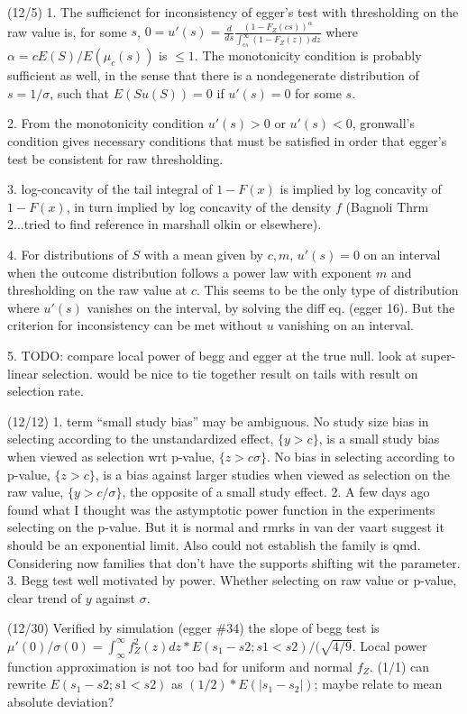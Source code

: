 \documentclass{article}
\begin{document}
(12/5) 1. The sufficienct for inconsistency of egger's test with
thresholding on the raw value is, for some $s$,
$0=u'(s)=\frac{d}{ds}\frac{(1-F_Z(cs))^\alpha}{\int_{cs}^{\infty}(1-F_Z(z))dz}$
where $\alpha=cE(S)/E(\mu_c(s))$ is $\le 1$. The monotonicity condition is probably
sufficient as well, in the sense that there is a nondegenerate distribution
of $s=1/\sigma$, such that $E(Su(S))=0$ if $u'(s)=0$ for some $s$.

2. From the monotonicity condition $u'(s)>0$ or $u'(s)<0$, gronwall's
condition gives necessary conditions that must be satisfied in order
that egger's test be consistent for raw thresholding.

3. log-concavity of the tail integral of $1-F(x)$ is implied by log
concavity of $1-F(x)$, in turn implied by log concavity of the density
$f$ (Bagnoli Thrm 2...tried to find reference in marshall olkin or
elsewhere).

4. For distributions of $S$ with a mean given by $c,m$, $u'(s)=0$ on
an interval when the outcome distribution follows a power law with
exponent $m$ and thresholding on the raw value at $c$. This seems to
be the only type of distribution where $u'(s)$ vanishes on the
interval, by solving the diff eq. (egger 16). But the criterion for
inconsistency can be met without $u$ vanishing on an interval.

5. TODO: compare local power of begg and egger at the true null. look at super-linear selection. would be nice to tie together result on tails with result on selection rate.

(12/12)
1. term ``small study bias'' may be ambiguous. No study size bias in selecting according to the unstandardized effect, $\{y>c\}$, is a small study bias when viewed as selection wrt p-value, $\{z>c\sigma\}$. No bias in selecting according to p-value, $\{z>c\}$, is a bias against larger studies when viewed as selection on the raw value, $\{y>c/\sigma\}$, the opposite of a small study effect.
2. A few days ago found what I thought was the astymptotic power function in the experiments selecting on the p-value. But it is normal and rmrks in van der vaart suggest it should be an exponential limit. Also could not establish the family is qmd. Considering now families that don't have the supports shifting wit the parameter.
3. Begg test well motivated by power. Whether selecting on raw value or p-value, clear trend of $y$ against $\sigma$.

(12/30)
Verified by simulation (egger \#34) the slope of begg test is $\mu'(0)/\sigma(0)=\int_\infty^\infty f_Z^2(z)dz * E(s_1-s2; s1<s2) / (\sqrt{4/9}$. Local power function approximation is not too bad for uniform and normal $f_Z$. (1/1) can rewrite $E(s_1-s2; s1<s2)$ as $(1/2)*E(|s_1-s_2|)$; maybe relate to mean absolute deviation?
\end{document}
